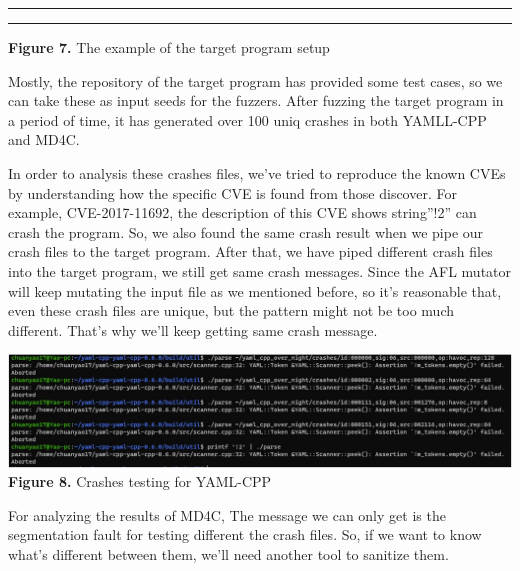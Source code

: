 \documentclass[12pt]{diazessay}
\begin{document}
\vspace{10mm}
\hrule height 0.4mm
\begingroup \fontsize{12pt}{12pt} \selectfont \begin{alltt}

\end{alltt} \vspace{-6mm} \endgroup \hrule height 0.4mm
\vspace{6mm}
\centerline{\textbf{Figure 7.} The example of the target program setup}
\vspace{6mm}

Mostly, the repository of the target program has provided some test cases, so we can take these as input seeds for the fuzzers.
After fuzzing the target program in a period of time, it has generated over 100 uniq crashes in both YAMLL-CPP and MD4C. 


In order to analysis these crashes files, we've tried to reproduce the known CVEs by understanding how the specific CVE is found from those discover.
For example, CVE-2017-11692\cite{CVE-2017-11692}, the description of this CVE shows string”!2” can crash the program.
So, we also found the same crash result when we pipe our crash files to the target program.
After that, we have piped different crash files into the target program, we still get same crash messages.
Since the AFL mutator will keep mutating the input file as we mentioned before, so it's reasonable that, even these crash files are unique, but the pattern might not be too much different. That's why we'll keep getting same crash message.

\vspace{3mm}
\begin{center}
	\includegraphics[scale=0.35, trim={0 0 0 0}, clip]{yaml_cpp_crashes.png}\\
	\textbf{Figure 8.} Crashes testing for YAML-CPP
\end{center}
\vspace{3mm}

For analyzing the results of MD4C, The message we can only get is the segmentation fault for testing different the crash files. So, if we want to know what's different between them, we'll need another tool to sanitize them.
\end{document}
